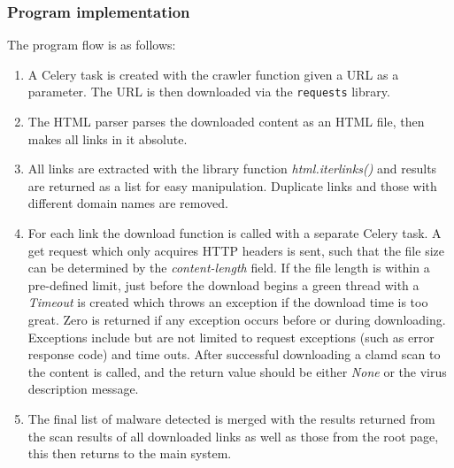 \subsubsection{Program implementation}
The program flow is as follows:
\begin{enumerate}
\item A Celery task is created with the crawler function given a URL as a 
parameter. The URL is then downloaded via the \verb`requests` library. 

\item The HTML parser parses the downloaded content as an HTML file, then makes 
all links in it absolute.

\item All links are extracted with the library function {\em html.iterlinks()} and
results are returned as a list for easy manipulation. Duplicate links and 
those with different domain names are removed.

\item For each link the download function is called with a separate Celery 
task. A get request which only acquires HTTP headers is sent, such that the file size can be determined by the 
{\em content-length} field. If the file length is within a pre-defined limit, just before 
the download begins a green thread with a {\em Timeout} is created which throws 
an exception if the download time is too great. Zero is returned if any exception 
occurs before or during downloading. Exceptions include but are not limited to request 
exceptions (such as error response code) and time outs. After successful 
downloading a clamd scan to the content is called, and the return value should be 
either {\em None} or the virus description message. 

\item The final list of malware detected is merged with the results 
returned from the scan results of all downloaded links as well as those from the root 
page, this then returns to the main system.  
\end{enumerate}
